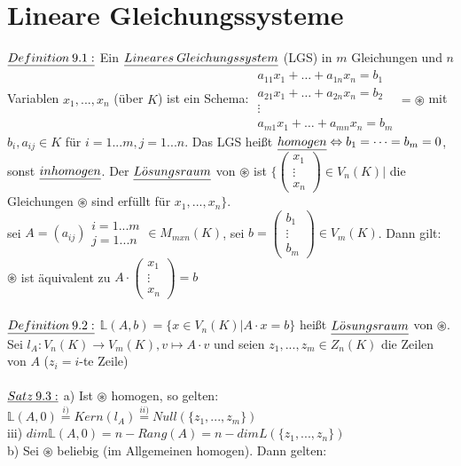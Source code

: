 \documentclass[fleqn, a4paper, 11pt]{scrartcl}
\theoremstyle{definition}
\begin{document}
\section{Lineare Gleichungssysteme}

$\uline{Definition\:9.1:}$ Ein $\uline{Lineares\:Gleichungssystem}$ (LGS) in $m$ Gleichungen und $n$ Variablen $x_1,...,x_n$ (über $K$) ist ein Schema: $\begin{matrix}
	a_{11}x_1 +\dots + a_{1n}x_n=b_1\\
	a_{21}x_1 +\dots + a_{2n}x_n=b_2\\
	\vdots\\
	a_{m1}x_1+\dots +a_{mn}x_n=b_m
\end{matrix}=\circledast$ mit $b_i,a_{ij}\in K$ für $i=1...m,j=1...n$. Das LGS heißt $\uline{homogen}\Leftrightarrow b_1=\dots=b_m=0$, sonst $\uline{inhomogen}$. Der $\uline{L\ddot{o}sungsraum}$ von $\circledast$ ist $\{\begin{pmatrix}
	x_1\\
	\vdots\\
	x_n
\end{pmatrix}\in V_n(K)|$ die Gleichungen $\circledast$ sind erfüllt für $x_1,...,x_n\}$.\\
sei $A=(a_{ij})\substack{i=1...m\\j=1...n}\in M_{mxn}(K)$, sei $b=\begin{pmatrix}
	b_1\\
	\vdots\\
	b_m
\end{pmatrix}\in V_m(K)$. Dann gilt: $\circledast$ ist äquivalent zu $A\cdot\begin{pmatrix}
	x_1\\
	\vdots\\
	x_n
\end{pmatrix}=b$\\
\\
$\uline{Definition\:9.2:}$ $\mathbb{L}(A,b)=\{x\in V_n(K)|A\cdot x=b\}$ heißt $\uline{L\ddot{o}sungsraum}$ von $\circledast$. Sei $l_A:V_n(K)\rightarrow V_m(K),v\mapsto A\cdot v$ und seien $z_1,...,z_m\in Z_n(K)$ die Zeilen von $A$ ($z_i=i$-te Zeile)\\
\\
$\uline{Satz\:9.3:}$ a) Ist $\circledast$ homogen, so gelten: $\mathbb{L}(A,0)\stackrel{i)}{=}Kern(l_A)\stackrel{ii)}{=}Null(\{z_1,...,z_m\})$\\
iii) $dim \mathbb{L}(A,0)=n-Rang(A)=n-dim L(\{z_1,...,z_n\})$\\
b) Sei $\circledast$ beliebig (im Allgemeinen homogen). Dann gelten:\\
\end{document}
